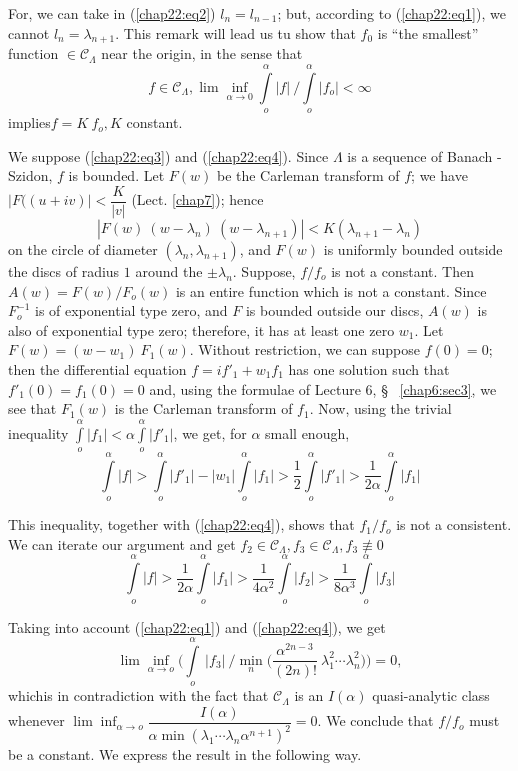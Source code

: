 For, we can take in (\ref{chap22:eq2}) $l_n = l_{n-1}$; but, according
to (\ref{chap22:eq1}), we
cannot $l_n = \lambda_{n+1}$. This remark will lead us tu show that
$f_0$ is ``the smallest'' function $\in \mathscr{C}_\Lambda$ near the
origin, in the sense that 
\begin{equation}
 f \in \mathscr{C}_\Lambda,\lim\inf_{\alpha \rightarrow 0}
 \int\limits_o^\alpha | f | ~ / \int\limits_o^\alpha | f_o | < \infty
 \tag{4}\label{chap22:eq4} 
\end{equation}
implies\pageoriginale $f = K ~ f_o, K$ constant.

We suppose (\ref{chap22:eq3}) and (\ref{chap22:eq4}). Since $\Lambda$ is a sequence of Banach -
Szidon, $f$ is bounded. Let $F(w)$ be the Carleman transform of $f$;
we have $| F((u+iv) | < \dfrac{K}{|v|}$ (Lect. \ref{chap7}); hence 
$$
| F(w) ~ (w - \lambda_n) ~ (w - \lambda_{n+1}) | < K(\lambda_{n+1} - \lambda_n)
$$
on the circle of diameter $(\lambda_n, \lambda_{n+1})$, and $F(w)$ is
uniformly bounded outside the discs of radius $1$ around the $\pm
\lambda_n$. Suppose, $f/f_o$ is not a constant. Then $A(w) = F(w) /
F_o (w)$ is an entire function which is not a constant. Since
$F^{-1}_o$ is of exponential type zero, and $F$ is bounded outside our
discs, $A(w)$ is also of exponential type zero; therefore, it has at
least one zero $w_1$. Let $F(w) = (w - w_1) ~ F_1(w)$. Without
restriction, we can suppose $f(0) = 0$; then the differential equation
$f = if'_1 + w_1 f_1$ has one solution such that $f'_1(0) = f_1(0) =
0$ and, using the formulae of Lecture 6, \S ~ \ref{chap6:sec3}, we see that
$F_1(w)$ is the Carleman transform of $f_1$. Now, using the trivial
inequality $\int\limits_{o}^\alpha | f_1 | < \alpha
\int\limits_o^\alpha | f'_1 |$, we get, for $\alpha $ small enough, 
$$
\int\limits_o^\alpha | f | > \int\limits_o^\alpha |f'_1 | - | w_1 |
\int\limits_o^\alpha |f_1| > \frac{1}{2} \int\limits^\alpha_o | f'_1 |
> \frac{1}{2\alpha} \int\limits_o^\alpha | f_1 | 
$$

This inequality, together with (\ref{chap22:eq4}), shows that $f_1/f_o$ is not a
consistent. We can iterate our argument and get $f_2 \in
\mathscr{C}_\Lambda, f_3 \in \mathscr{C}_\Lambda, f_3 \nequiv 0$ 
$$
\int\limits_o^\alpha | f | > \frac{1}{2\alpha} \int\limits_o^\alpha |
f_1 | > \frac{1}{4 \alpha^2} \int\limits_o^\alpha | f_2 | > \frac{1}{8
 \alpha^3} \int\limits_o^\alpha | f_3 | 
$$

Taking into account (\ref{chap22:eq1}) and (\ref{chap22:eq4}), we get
$$
\lim\inf_{\alpha \rightarrow o} \Big( \int\limits_o^\alpha ~ \Big |
f_3 | ~\Big/ \min_n \Big( \frac{\alpha^{2n -3}}{(2n)!} ~ \lambda^2_1
\cdots \lambda^2_n \Big)\Big) = 0, 
$$
which\pageoriginale is in contradiction with the fact that $\mathscr{C}_\Lambda$ is
an $I(\alpha)$ quasi-analytic class whenever $\lim\inf_{\alpha
 \rightarrow o}\dfrac{I(\alpha)}{\alpha \min (\lambda_1 \cdots
 \lambda_n \alpha^{n+1})^2} = 0$. We conclude that $f/f_o$ must be a
constant. We express the result in the following way. 

